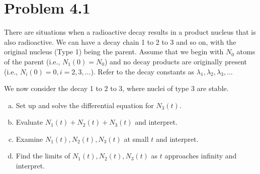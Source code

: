 \documentclass[12pt,a4paper]{article}
\begin{document}
	
	\section*{
		Problem 4.1
	}
	\begin{problem}
		There are situations when a radioactive decay results in a product nucleus
		that is also radioactive. We can have a decay chain 1 to 2 to 3 and so on,
		with the original nucleus (Type 1) being the parent. Assume that we begin
		with $N_0$ atoms of the parent (i.e., $N_1(0) = N_0$) and no decay products are
		originally present (i.e., $N_i(0) = 0, i =2, 3,\ldots$). Refer to the decay constants as
		$\lambda_1, \lambda_2, \lambda_3,\ldots$

		We now consider the decay 1 to 2 to 3, where nuclei of type 3 are stable.
		\begin{enumerate}[(a)]
		    \item Set up and solve the differential equation for $N_3(t)$.
			\item Evaluate $N_1(t) + N_2(t)+ N_3(t)$ and interpret.
			\item Examine $N_1(t),N_2(t),N_3(t)$ at small $t$ and interpret.
			\item Find the limits of $N_1(t),N_2(t),N_3(t)$ as $t$ approaches infinity
				  and interpret.
		\end{enumerate}
	\end{problem}
\end{document}
